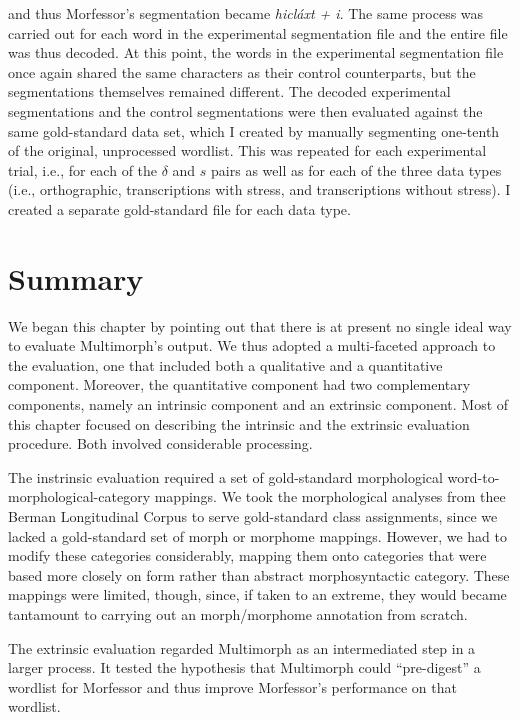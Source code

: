 {and thus Morfessor's segmentation became \textit{hicl\'{a}xt + i}.
The same process was carried out for each word in the experimental segmentation file and the entire file was thus decoded. At this point, the words in the experimental segmentation file once again shared the same characters as their control counterparts, but the segmentations themselves remained different. 
The decoded experimental segmentations and the control segmentations were then evaluated against the same gold-standard data set, which I created by manually segmenting 
one-tenth of the original, unprocessed wordlist. 
This was repeated for each experimental trial, i.e., for each of the $\delta$ and $s$ 
pairs as well as for each of the three data types (i.e., orthographic, transcriptions with stress, 
and transcriptions without stress).
I created a separate gold-standard file for each data type.

\section{Summary}
We began this chapter by pointing out that there is at present no single ideal way to evaluate Multimorph's output.
We thus adopted a multi-faceted approach to the evaluation, one that included both a qualitative and
a quantitative component. Moreover, the quantitative component had two complementary components, namely an intrinsic component and an extrinsic component. Most of this chapter focused on describing the intrinsic and the extrinsic evaluation procedure. Both involved considerable processing. 

The instrinsic evaluation required a set of gold-standard morphological word-to-morphological-category mappings. We took the morphological analyses from thee Berman Longitudinal Corpus to serve gold-standard class assignments, since we lacked a gold-standard set of morph or morphome mappings. However, we had to modify these categories considerably, mapping them onto categories that were based more closely on form rather than abstract morphosyntactic category. These mappings were limited, though, since, if taken to an extreme, they would became tantamount to carrying out an morph/morphome annotation from scratch.

The extrinsic evaluation regarded Multimorph as an intermediated step in a larger process. It tested the hypothesis that Multimorph could ``pre-digest'' a wordlist for Morfessor and thus improve Morfessor's performance on that
wordlist.

}
